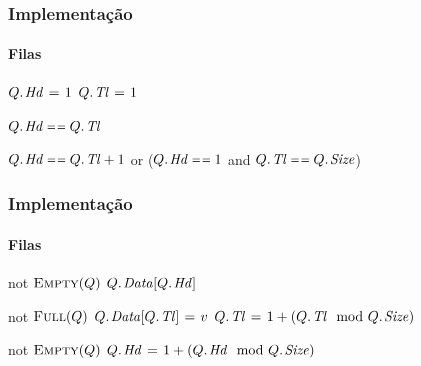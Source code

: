 \documentclass{beamer}
\begin{document}
\begin{frame}

  \frametitle{Implementação}
  \framesubtitle{Filas}

\begin{codebox}
\li $\attrib{Q}{Hd} \gets 1$
\li $\attrib{Q}{Tl} \gets 1$
\end{codebox}
\begin{codebox}
\li  \Return $\attrib{Q}{Hd} \isequal \attrib{Q}{Tl}$
\end{codebox}
\begin{codebox}
\li  \Return $\attrib{Q}{Hd} \isequal \attrib{Q}{Tl} + 1$ or
\li  \> ($\attrib{Q}{Hd} \isequal 1$ and $\attrib{Q}{Tl} \isequal \attrib{Q}{Size}$)
\end{codebox}

\end{frame}

\begin{frame}

  \frametitle{Implementação}
  \framesubtitle{Filas}

\begin{codebox}
\li  \If not $\textnormal{\scshape Empty}(Q)$
\li    \Then \Return $\attrib{Q}{Data}[\attrib{Q}{Hd}]$
     \End
\end{codebox}
\begin{codebox}
\li  \If not $\textnormal{\scshape Full}(Q)$
\li    \Then $\attrib{Q}{Data}[\attrib{Q}{Tl}] \gets v$
\li      $\attrib{Q}{Tl} \gets 1 + (\attrib{Q}{Tl} \mod \attrib{Q}{Size})$
     \End
\end{codebox}
\begin{codebox}
\li  \If not $\textnormal{\scshape Empty}(Q)$
\li    \Then $\attrib{Q}{Hd} \gets 1 + (\attrib{Q}{Hd} \mod \attrib{Q}{Size})$
     \End
\end{codebox}

\end{frame}
\end{document}
